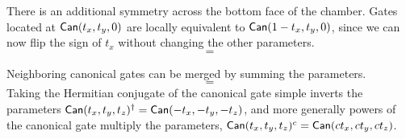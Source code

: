 
There is an additional symmetry across the bottom face of the chamber. Gates located at $\Gate{Can}(t_x, t_y, 0)$ are locally equivalent to $\Gate{Can}(1-t_x, t_y, 0)$, since we can now flip the sign of $t_x$ without changing the other parameters.
$$

= 
 
$$

%
 Neighboring canonical gates can be merged by summing the parameters. 
$$

= 

$$
Taking the Hermitian conjugate of the canonical gate simple inverts the parameters $\Gate{Can}(t_x, t_y, t_z)^\dagger  = \Gate{Can}(-t_x, -t_y, -t_z)$, and more generally powers of the canonical gate multiply the parameters, $\Gate{Can}(t_x, t_y, t_z)^c = \Gate{Can}(c t_x, c t_y, c t_z)$.



